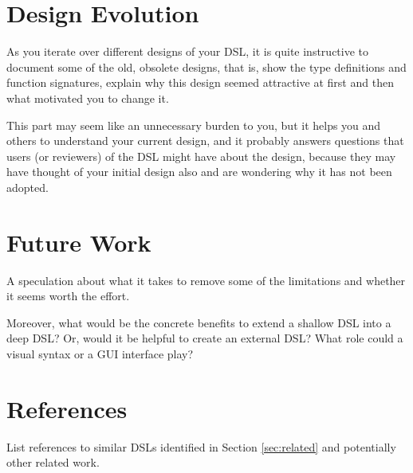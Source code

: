 \documentclass[11pt]{article}
\begin{document}


\section{Design Evolution}
\label{sec:evol}

As you iterate over different designs of your DSL, it is quite instructive to
document some of the old, obsolete designs, that is, show the type definitions
and function signatures, explain why this design seemed attractive at first
and then what motivated you to change it.

This part may seem like an unnecessary burden to you, but it helps you and
others to understand your current design, and it probably answers questions
that users (or reviewers) of the DSL might have about the design, because they
may have thought of your initial design also and are wondering why it has not
been adopted.



\section{Future Work}
\label{sec:future}

A speculation about what it takes to remove some of the limitations and
whether it seems worth the effort.

Moreover, what would be the concrete benefits to extend a shallow DSL into a
deep DSL? Or, would it be helpful to create an external DSL? What role could a
visual syntax or a GUI interface play?



\section*{References}

List references to similar DSLs identified in Section \ref{sec:related} and
potentially other related work.


%
\end{document}
